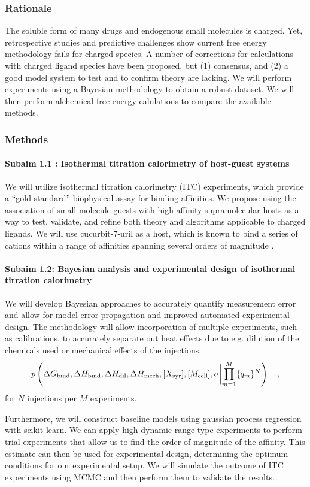 \documentclass[10pt]{article}
\newcommand{\subsubsubsection}[1]{\paragraph*{#1}}
\begin{document}
\subsubsection*{Rationale}
The soluble form of many drugs and endogenous small molecules is charged. Yet, retrospective studies and predictive challenges show current free energy methodology fails for charged species\cite{Rocklin2013b,Muddana2014a}. 
A number of corrections for calculations with charged ligand species have been proposed, but (1) consensus, and (2) a good model system to test and to confirm theory are lacking. We will perform experiments using a Bayesian methodology to obtain a robust dataset. We will then perform alchemical free energy calulations to compare the available methods.
\subsubsection*{Methods}
\subsubsubsection{Subaim 1.1 : Isothermal titration calorimetry of host-guest systems}
We will utilize isothermal titration calorimetry (ITC) experiments, which provide a “gold standard” biophysical assay for binding affinities. 
We propose using the association of small-molecule guests with high-affinity supramolecular hosts as a way to test, validate, and refine both theory and algorithms applicable to charged ligands.
We will use cucurbit-7-uril \cite{Lagona2005a} as a host, which is known to bind a series of cations within a range of affinities spanning several orders of magnitude \cite{Cao2013a}.

\subsubsubsection{Subaim 1.2: Bayesian analysis and experimental design of isothermal titration calorimetry}
We will develop Bayesian approaches to accurately quantify measurement error and allow for model-error propagation and improved automated experimental design.
The methodology will allow incorporation of multiple experiments, such as calibrations, to accurately separate out heat effects due to e.g. dilution of the chemicals used or mechanical effects of the injections.
\begin{align}
	p\left(\Delta G_\mathrm{bind}, \Delta H_\mathrm{bind}, \Delta H_\mathrm{dil},\Delta H_\mathrm{mech}, [X_\mathrm{syr}], [M_\mathrm{cell}], \sigma \biggl{|} \prod\limits_{m=1}^{M}\{q_m\}^{N}\right) \quad,
\end{align}
for $N$ injections per $M$ experiments.

Furthermore, we will construct baseline models using gaussian process regression with scikit-learn\cite{Pedregosa2011a}.
We can apply high dynamic range type experiments to perform trial experiments that allow us to find the order of magnitude of the affinity.
This estimate can then be used for experimental design, determining the optimum conditions for our experimental setup.
We will simulate the outcome of ITC experiments using MCMC and then perform them to validate the results. 
\end{document}
